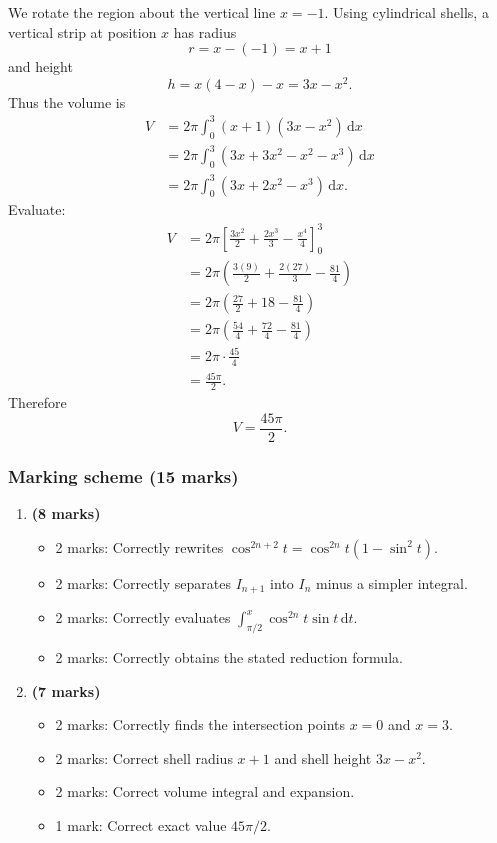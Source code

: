 \documentclass[12pt]{article}
\newcommand{\dd}{\,\mathrm{d}}
\begin{document}
\begin{enumerate}[label=(\alph*)]
We rotate the region about the vertical line $x=-1$. Using cylindrical shells, a vertical strip at position $x$ has radius
\[
r=x-(-1)=x+1
\]
and height
\[
h=x(4-x)-x=3x-x^2.
\]
Thus the volume is
\begin{align*}
V
&=
2\pi\int_0^3 (x+1)(3x-x^2)\dd x\\
&=
2\pi\int_0^3
\left(3x+3x^2-x^2-x^3\right)\dd x\\
&=
2\pi\int_0^3
\left(3x+2x^2-x^3\right)\dd x.
\end{align*}
Evaluate:
\begin{align*}
V
&=
2\pi
\left[
\frac{3x^2}{2}
+
\frac{2x^3}{3}
-
\frac{x^4}{4}
\right]_0^3\\
&=
2\pi
\left(
\frac{3(9)}{2}
+
\frac{2(27)}{3}
-
\frac{81}{4}
\right)\\
&=
2\pi
\left(
\frac{27}{2}
+
18
-
\frac{81}{4}
\right)\\
&=
2\pi
\left(
\frac{54}{4}
+
\frac{72}{4}
-
\frac{81}{4}
\right)\\
&=
2\pi\cdot \frac{45}{4}\\
&=
\frac{45\pi}{2}.
\end{align*}
Therefore
\[
\boxed{V=\frac{45\pi}{2}.}
\]
\end{enumerate}

\subsubsection{Marking scheme (15 marks)}

\begin{enumerate}[label=(\alph*)]
\item \textbf{(8 marks)}
\begin{itemize}
\item 2 marks: Correctly rewrites $\cos^{2n+2}t=\cos^{2n}t(1-\sin^2t)$.
\item 2 marks: Correctly separates $I_{n+1}$ into $I_n$ minus a simpler integral.
\item 2 marks: Correctly evaluates $\int_{\pi/2}^{x}\cos^{2n}t\sin t\dd t$.
\item 2 marks: Correctly obtains the stated reduction formula.
\end{itemize}

\item \textbf{(7 marks)}
\begin{itemize}
\item 2 marks: Correctly finds the intersection points $x=0$ and $x=3$.
\item 2 marks: Correct shell radius $x+1$ and shell height $3x-x^2$.
\item 2 marks: Correct volume integral and expansion.
\item 1 mark: Correct exact value $45\pi/2$.
\end{itemize}
\end{enumerate}
\end{document}
